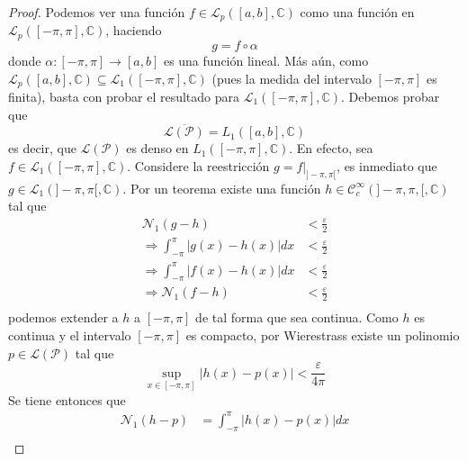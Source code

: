 \documentclass[12pt]{report}
\theoremstyle{largebreak}
\newcommand\abs[1]{\ensuremath{\left|#1\right|}}
\newcommand\cf[3]{\ensuremath{#1:#2\rightarrow#3}}
\newcommand{\N}[2]{\ensuremath{\mathcal{N}_{#1}\left(#2\right)}}
\begin{document}
    \begin{proof}
        Podemos ver una función $f\in\mathcal{L}_p([a,b],\mathbb{C})$ como una función en $\mathcal{L}_p([-\pi,\pi],\mathbb{C})$, haciendo
        \begin{equation*}
            g=f\circ \alpha
        \end{equation*}
        donde $\cf{\alpha}{[-\pi,\pi]}{[a,b]}$ es una función lineal. Más aún, como $\mathcal{L}_p([a,b],\mathbb{C})\subseteq\mathcal{L}_1([-\pi,\pi],\mathbb{C})$ (pues la medida del intervalo $[-\pi,\pi]$ es finita), basta con probar el resultado para $\mathcal{L}_1([-\pi,\pi],\mathbb{C})$. Debemos probar que
        \begin{equation*}
            \overline{\mathcal{L}(\mathcal{P})}=L_1([a,b],\mathbb{C})
        \end{equation*}
        es decir, que $\mathcal{L}(\mathcal{P})$ es denso en $L_1([-\pi,\pi],\mathbb{C})$. En efecto, sea $f\in\mathcal{L}_1([-\pi,\pi],\mathbb{C})$. Considere la reestricción $g=f\big|_{]-\pi,\pi[}$, es inmediato que $g\in\mathcal{L}_1(]-\pi,\pi[,\mathbb{C})$. Por un teorema existe una función $h\in\mathcal{C}_c^\infty(]-\pi,\pi,[,\mathbb{C})$ tal que
        \begin{equation*}
            \begin{split}
                \N{1}{g-h}&<\frac{\varepsilon}{2}\\
                \Rightarrow \int_{ -\pi}^{\pi}\abs{g(x)-h(x)}dx&<\frac{\varepsilon}{2}\\
                \Rightarrow \int_{ -\pi}^{\pi}\abs{f(x)-h(x)}dx&<\frac{\varepsilon}{2}\\
                \Rightarrow \N{1}{f-h}&<\frac{\varepsilon}{2}\\
            \end{split}
        \end{equation*}
        podemos extender a $h$ a $[-\pi,\pi]$ de tal forma que sea continua. Como $h$ es continua y el intervalo $[-\pi,\pi]$ es compacto, por Wierestrass existe un polinomio $p\in\mathcal{L}(\mathcal{P})$ tal que
        \begin{equation*}
            \sup_{ x\in[-\pi,\pi]}\abs{h(x)-p(x)}<\frac{\varepsilon}{4\pi}
        \end{equation*}
        Se tiene entonces que
        \begin{equation*}
            \begin{split}
                \N{1}{h-p}&=\int_{ -\pi}^\pi\abs{h(x)-p(x)}dx\\

\end{split}
\end{equation*}
\end{proof}
\end{document}
